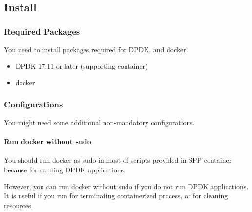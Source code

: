\documentclass[a4paper,11pt,openany,oneside,english]{sphinxmanual}
\begin{document}
\begin{sphinxVerbatim}[commandchars=\\\{\},formatcom=\footnotesize]
\end{sphinxVerbatim}


\subsection{Install}
\label{\detokenize{tools/sppc/install:install}}\label{\detokenize{tools/sppc/install:spp-container-install}}\label{\detokenize{tools/sppc/install::doc}}

\subsubsection{Required Packages}
\label{\detokenize{tools/sppc/install:required-packages}}\label{\detokenize{tools/sppc/install:sppc-install-required}}
You need to install packages required for DPDK, and docker.
\begin{itemize}
\item {} 
DPDK 17.11 or later (supporting container)

\item {} 
docker

\end{itemize}


\subsubsection{Configurations}
\label{\detokenize{tools/sppc/install:configurations}}\label{\detokenize{tools/sppc/install:sppc-install-config}}
You might need some additional non-mandatory configurations.


\paragraph{Run docker without sudo}
\label{\detokenize{tools/sppc/install:run-docker-without-sudo}}
You should run docker as sudo in most of scripts provided in
SPP container because for running DPDK applications.

However, you can run docker without sudo if you do not run DPDK
applications.
It is useful if you run  for terminating containerized
process,  or  for cleaning resources.
\end{document}
